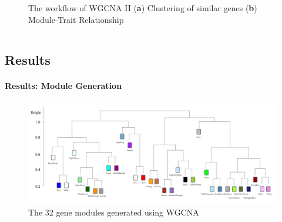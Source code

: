 \documentclass[
11pt,notheorems,hyperref={pdfauthor=whatever}
]{beamer}
\begin{document}
\begin{frame}
\begin{columns}[T,onlytextwidth]
\begin{figure}[h]
            \captionsetup{justification=centering}
            \caption{The workflow of WGCNA II (\textbf{a}) Clustering of similar genes (\textbf{b}) Module-Trait Relationship}
        \end{figure}
    \end{columns}
\end{frame}

\subsection{Results}
\begin{frame}
    \framesubtitle{Results: Module Generation}
    \begin{figure}[h]
        \hspace{-30px}
        \renewcommand{\figurename}{Figure 7}
        \includegraphics [scale=0.44] {AldoFruc_ModuleResult.jpg} 
        \captionsetup{justification=centering}
        \caption{The 32 gene modules generated using WGCNA}
    \end{figure}
\end{frame}
\end{document}
